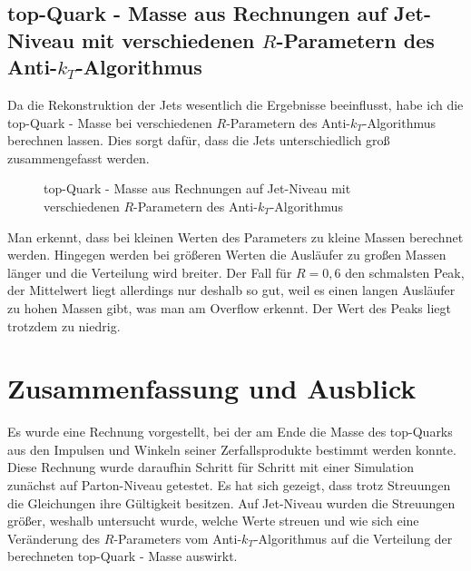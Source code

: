 \documentclass[
a4paper,                                %
twoside,                                %
BCOR1.4cm,                      %
ngerman,                                %
10pt,                           %
headings=normal,                %
headsepline,                    %
clearplainpage, %
final,                                  %
div=14,
parskip=full
]{scrbook}
\begin{document}
\newpage

\section{top-Quark - Masse aus Rechnungen auf Jet-Niveau mit verschiedenen $ R $-Parametern des Anti-$ k_{T} $-Algorithmus}

Da die Rekonstruktion der Jets wesentlich die Ergebnisse beeinflusst, habe ich die top-Quark - Masse bei verschiedenen $ R $-Parametern des Anti-$ k_{T} $-Algorithmus berechnen lassen. Dies sorgt daf\"ur, dass die Jets unterschiedlich gro\ss\; zusammengefasst werden.

\begin{figure}[H]
    \caption{top-Quark - Masse aus Rechnungen auf Jet-Niveau mit verschiedenen $ R $-Parametern des Anti-$ k_{T} $-Algorithmus}
\end{figure}

Man erkennt, dass bei kleinen Werten des Parameters zu kleine Massen berechnet werden. Hingegen werden bei gr\"o\ss eren Werten die Ausl\"aufer zu gro\ss en Massen l\"anger und die Verteilung wird breiter. Der Fall f\"ur $ R = 0,6 $ den schmalsten Peak, der Mittelwert liegt allerdings nur deshalb so gut, weil es einen langen Ausl\"aufer zu hohen Massen gibt, was man am Overflow erkennt. Der Wert des Peaks liegt trotzdem zu niedrig. 

\chapter{Zusammenfassung und Ausblick}

Es wurde eine Rechnung vorgestellt, bei der am Ende die Masse des top-Quarks aus den Impulsen und Winkeln seiner Zerfallsprodukte bestimmt werden konnte. Diese Rechnung wurde daraufhin Schritt f\"ur Schritt mit einer Simulation zun\"achst auf Parton-Niveau getestet. Es hat sich gezeigt, dass trotz Streuungen die Gleichungen ihre G\"ultigkeit besitzen. Auf Jet-Niveau wurden die Streuungen gr\"o\ss er, weshalb untersucht wurde, welche Werte streuen und wie sich eine Ver\"anderung des $ R $-Parameters vom Anti-$ k_{T} $-Algorithmus auf die Verteilung der berechneten top-Quark - Masse auswirkt.
\end{document}

